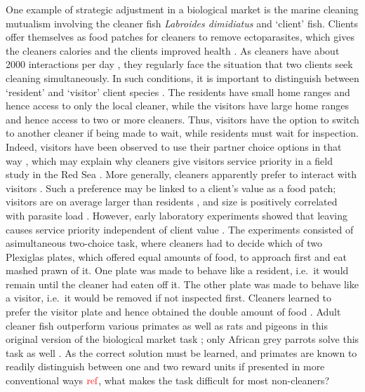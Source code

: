 \documentclass[]{rsos}%
\begin{document}
One example of strategic adjustment in a biological market is the marine
cleaning mutualism involving the cleaner fish \emph{Labroides dimidiatus} and
`client' fish. Clients offer themselves as food patches for cleaners to
remove ectoparasites, which gives the cleaners calories and the clients
improved health \citep{waldie_LongTerm_2011, ros_Does_2011, triki_Effects_2016}. As cleaners have about 2000
interactions per day \citep{grutter_Relationship_1995}, they regularly face
the situation that two clients seek cleaning simultaneously. In such
conditions, it is important to distinguish between `resident' and
`visitor' client species \citep{bshary_Cleaner_2001a}. The residents have
small home ranges and hence access to only the local cleaner, while the
visitors have large home ranges and hence access to two or more
cleaners. Thus, visitors have the option to switch to another cleaner if
being made to wait, while residents must wait for inspection. Indeed,
visitors have been observed to use their partner choice options in that
way \citep{bshary_Choosy_2002}, which may explain why cleaners give
visitors service priority in a field study in the Red Sea
\citep{bshary_Cleaner_2001a}. More generally, cleaners apparently prefer to
interact with visitors \citep{triki_Marine_2021}. Such a preference may be
linked to a client's value as a food patch; visitors are on average
larger than residents \citep{bshary_Cleaner_2001a}, and size is positively
correlated with parasite load \citep{grutter_Relationship_1995}. However,
early laboratory experiments showed that leaving causes service
priority independent of client value \citep{bshary_Asymmetric_2002}.
The experiments consisted of asimultaneous two-choice task,
where cleaners had to decide which of two
Plexiglas plates, which offered equal amounts of food, to approach first
and eat mashed prawn of it. One plate was made to behave like a
resident, i.e.~it would remain until the cleaner had eaten off it. The
other plate was made to behave like a visitor, i.e.~it would be removed
if not inspected first. Cleaners learned to prefer the visitor plate and
hence obtained the double amount of food \citep{bshary_Asymmetric_2002}.
Adult cleaner fish outperform various primates as well as rats and
pigeons in this original version of the biological market task
\citep{salwiczek_Adult_2012, zentall_Early_2017}; only African grey
parrots solve this task as well \citep{pepperberg_Can_2014}. As the correct
solution must be learned, and primates are known to readily distinguish
between one and two reward units if presented in more conventional ways
\(\color{red}{\text{ref}}\), what makes the task difficult for most non-cleaners?
\end{document}
